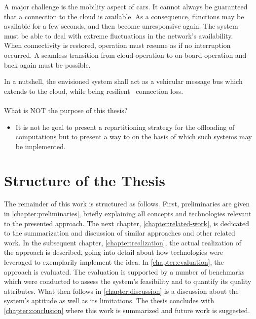 A major challenge is the mobility aspect of cars. It cannot always be guaranteed that a connection to the cloud is available. As a consequence, functions may be available for a few seconds, and then become unresponsive again. The system must be able to deal with extreme fluctuations in the network's availability. When connectivity is restored, operation must resume as if no interruption occurred. A seamless transition from cloud-operation to on-board-operation and back again must be possible.

In a nutshell, the envisioned system shall act as a vehicular message bus which extends to the cloud, while being resilient \wrt\ connection loss.

\paragraph{}
What is NOT the purpose of this thesis?
\begin{itemize}
\item It is not he goal to present a repartitioning strategy for the offloading of computations but to present a way to on the basis of which such systems may be implemented.
\end{itemize}


%
%
%
%
%
%
%
%
%
%


\section{Structure of the Thesis}
The remainder of this work is structured as follows. First, preliminaries are given in \autoref{chapter:preliminaries}, briefly explaining all concepts and technologies relevant to the presented approach. The next chapter, \autoref{chapter:related-work}, is dedicated to the summarization and discussion of similar approaches and other related work. In the subsequent chapter, \autoref{chapter:realization}, the actual realization of the approach is described, going into detail about how technologies were leveraged to exemplarily implement the idea. In \autoref{chapter:evaluation}, the approach is evaluated. The evaluation is supported by a number of benchmarks which were conducted to assess the system's feasibility and to quantify its quality attributes. What then follows in \autoref{chapter:discussion} is a discussion about the system's aptitude as well as its limitations. The thesis concludes with \autoref{chapter:conclusion} where this work is summarized and future work is suggested.

%
%
%
%
%
%
%
%
%
%
%
%
%
%
%
%
%
%
%
%
%
%
%
%
%
%
%
%
%
%
%
%
%
%
%
%
%
%
